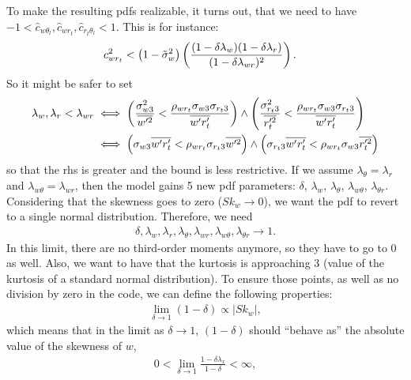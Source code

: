 To make the resulting \glspl{pdf} realizable, it turns out\autocite{larson2022clubbsilhs}, that we need to have
$-1 < \widehat{c}_{w \theta_l}, \widehat{c}_{w r_t}, \widehat{c}_{r_t \theta_l} < 1$.
This is for instance:
\begin{align}
    c_{w r_t}^2 &< \left( 1 - \tilde{\sigma}_w^2 \right) \left(
    \frac{(1-\delta \lambda_w)(1-\delta \lambda_r)}{(1-\delta \lambda_{w r})^2}
    \right).
\end{align}
So it might be safer to set
\begin{align}
    \label{eq:lambda_corr_ineq}
    \lambda_w , \lambda_r < \lambda_{w r}
    &\iff
    \left(\frac{\sigma_{w 3}^2}{\overline{w'^2}} < \frac{\rho_{w r_t} \sigma_{w 3} \sigma_{r_t 3}}{\overline{w' r_t'}}\right)
    \land
    \left(\frac{\sigma_{r_t 3}^2}{\overline{r_t'^2}} < \frac{\rho_{w r_t} \sigma_{w 3} \sigma_{r_t 3}}{\overline{w' r_t'}}\right) \nonumber\\
    &\iff
    \left(\sigma_{w 3} \overline{w' r_t'} < \rho_{w r_t} \sigma_{r_t 3} \overline{w'^2}\right)
    \land
    \left(\sigma_{r_t 3} \overline{w' r_t'} < \rho_{w r_t} \sigma_{w 3} \overline{r_t'^2}\right) \nonumber\\
\end{align}
so that the \gls{rhs} is greater and the bound is less restrictive.
If we assume $\lambda_\theta = \lambda_r$ and $\lambda_{w\theta} = \lambda_{wr}$,
then the model gains 5 new \gls{pdf} parameters:
$\delta$, $\lambda_w$, $\lambda_\theta$, $\lambda_{w \theta}$, $\lambda_{\theta r}$.
Considering that the skewness goes to zero ($Sk_w \to 0$),
we want the \gls{pdf} to revert to a single normal distribution.
Therefore, we need
\begin{align}
    \delta, \lambda_w, \lambda_r, \lambda_\theta,
    \lambda_{w r}, \lambda_{w \theta}, \lambda_{\theta r}
    \to 1.
\end{align}
In this limit, there are no third-order moments anymore, so they have to go to 0 as well.
Also, we want to have that the kurtosis is approaching 3 (value of the kurtosis of a standard normal distribution).
To ensure those points, as well as no division by zero in the code, we can define the following properties:
\begin{align}
    \label{eq:delta_propto}
    \lim_{\delta \to 1} (1-\delta) \propto |Sk_w|,
\end{align}
which means that in the limit as $\delta \to 1$,
$(1-\delta)$ should \enquote{behave as} the absolute value of the skewness of $w$,
\begin{align}
    0 < \lim_{\delta\to 1} \frac{1-\delta\lambda_x}{1-\delta} < \infty,
\end{align}
